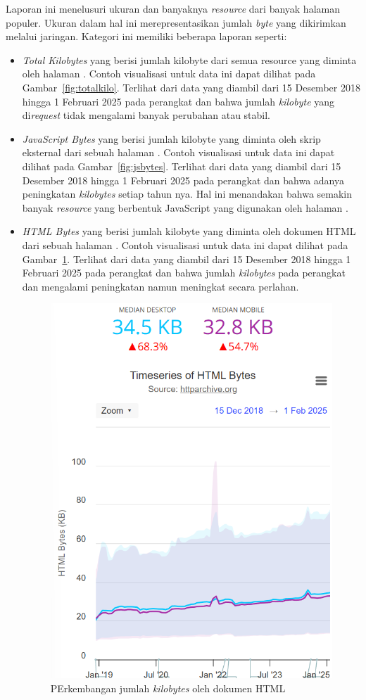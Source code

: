 Laporan ini menelusuri ukuran dan banyaknya \textit{resource} dari banyak halaman \web populer. Ukuran dalam hal ini merepresentasikan jumlah \textit{byte} yang dikirimkan melalui jaringan. Kategori ini memiliki beberapa laporan seperti:
\begin{itemize}
    \item \textit{Total Kilobytes} yang berisi jumlah kilobyte dari semua resource yang diminta oleh halaman \web. Contoh visualisasi untuk data ini dapat dilihat pada Gambar~\ref{fig:totalkilo}. Terlihat dari data yang diambil dari 15 Desember 2018 hingga 1 Februari 2025 pada perangkat \desktop dan \mobile bahwa jumlah \textit{kilobyte} yang di\textit{request} tidak mengalami banyak perubahan atau stabil.

    \item \textit{JavaScript Bytes} yang berisi jumlah kilobyte yang diminta oleh skrip eksternal dari sebuah halaman \web. Contoh visualisasi untuk data ini dapat dilihat pada Gambar~\ref{fig:jsbytes}. Terlihat dari data yang diambil dari 15 Desember 2018 hingga 1 Februari 2025 pada perangkat \desktop dan \mobile bahwa adanya peningkatan \textit{kilobytes} setiap tahun nya. Hal ini menandakan bahwa semakin banyak \textit{resource} yang berbentuk JavaScript yang digunakan oleh halaman \web.

    \item \textit{HTML Bytes} yang berisi jumlah kilobyte yang diminta oleh dokumen HTML dari sebuah halaman \web.  Contoh visualisasi untuk data ini dapat dilihat pada Gambar~\ref{fig:htmlreq}. Terlihat dari data yang diambil dari 15 Desember 2018 hingga 1 Februari 2025 pada perangkat \desktop dan \mobile bahwa jumlah \textit{kilobytes} pada perangkat \mobile dan \desktop mengalami peningkatan namun meningkat secara perlahan.
    \begin{figure}[H]
        \centering
        \includegraphics[width=0.4\linewidth]{Gambar/Contoh HTML Bytes.png}
        \caption{PErkembangan jumlah \textit{kilobytes} oleh dokumen HTML}
        \label{fig:htmlreq}
    \end{figure}

\end{itemize}


